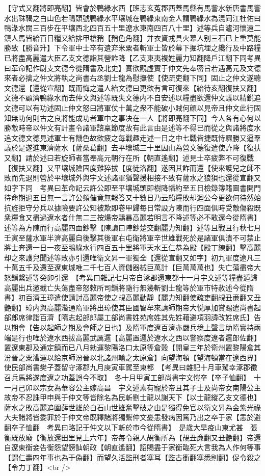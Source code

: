 【守式又翻將即亮翻】皆會於鴨綠水西【班志玄菟郡西蓋馬縣有馬訾水新唐書馬訾水出靺鞨之白山色若鴨頭號鴨綠水平壤城在鴨綠東南金人謂鴨綠水為混同江杜佑曰鴨淥水闊三百步在平壤西北四百五十里遼水東南四百八十里】述等兵自瀘河懷遠二鎮人馬皆給百日糧又給排甲槍矟【矟色角翻】并衣資戎具火幕人别三石已上重莫能勝致【勝音升】下令軍中士卒有遺弃米粟者斬軍士皆於幕下掘坑埋之纔行及中路糧已將盡高麗遣大臣乙支文德詣其營詐降【乙支東夷複姓麗力知翻降戶江翻下同考異曰革命記作尉支文德今從隋書及北史】實欲觀虛實于仲文先奉密旨若遇高元及文德來者必擒之仲文將執之尚書右丞劉士龍為慰撫使【使疏吏翻下同】固止之仲文遂聽文德還【還從宣翻】既而悔之遣人紿文德曰更欲有言可復來【紿待亥翻復扶又翻】文德不顧濟鴨綠水而去仲文與述等既失文德内不自安述以糧盡欲還仲文議以精鋭追文德可以有功述固止仲文怒曰將軍仗十萬之衆不能破小賊何顔以見帝且仲文此行固知無功何則古之良將能成功者軍中之事决在一人【將即亮翻下同】今人各有心何以勝敵時帝以仲文有計畫令諸軍諮稟節度故有此言由是述等不得已而從之與諸將度水追文德文德見述軍士有饑色故欲疲之每戰趣走述一日之中七戰皆捷既恃驟勝又逼羣議於是遂進東濟薩水【薩桑葛翻】去平壤城三十里因山為營文德復遣使詐降【復扶又翻】請於述曰若旋師者當奉高元朝行在所【朝直遙翻】述見士卒疲弊不可復戰【復扶又翻】又平壤城險固度難猝拔【度徒洛翻】遂因其詐而還【使來護兒之師不敗而先退則營於平壤城外與宇文述諸軍猶聲援相接不致有薩水之狼狽也還從宣翻又如字下同　考異曰革命記云許公即至平壤城頭即樹降幡約至五日檢錄簿籍圖書開門待命期過五日無一言許公頻催竟無報答又十數日乃云船糧敗却迴公今更欲何待然始抗旌拒守分兵以據險要許公知被欺即卷甲歸每日常設方陳而行四面俱時受敵傷殺既衆糧食又盡過遼水者什無二三按煬帝驕暴高麗若明言不降述等必不敢還今從隋書】述等為方陳而行高麗四面鈔擊【陳讀曰陣鈔楚交翻麗力知翻】述等且戰且行秋七月壬寅至薩水軍半濟高麗自後擊其後軍右屯衛將軍辛世雄戰死於是諸軍俱潰不可禁止將士奔還一日一夜至鴨綠水行四百五十里將軍天水王仁恭為殿【殿丁練翻】擊高麗却之來護兒聞述等敗亦引還唯衛文昇一軍獨全【還從宣翻又如字】初九軍度遼凡三十萬五千及還至遼東城唯二千七百人資儲器械巨萬計【巨萬萬萬也】失亡蕩盡帝大怒鎻繫述等癸卯引還　【考異曰雜記七月帝自涿郡還東都十一月宇文述等糧盡遁歸高麗出兵邀截亡失蕩盡帝怒敕所司鎻將隨行無幾斬劉士龍等於軍市特赦述今從隋書】初百濟王璋遣使請討高麗帝使之覘高麗動靜【麗力知翻使疏吏翻覘丑亷翻又丑艶翻】璋内與高麗濳通隋軍將出璋使其臣國智牟來請師期帝大悦厚加賞賜遣尚書起部郎席律詣百濟【隋志起部郎屬工部尚書姓苑席姓其先姓藉避項羽諱改姓席氏】告以期會【告以起師之期及會師之日也】及隋軍度遼百濟亦嚴兵境上聲言助隋實持兩端是行也唯於遼水西拔高麗武厲邏【高麗置邏於遼水之西以警察度遼者邏郎佐翻】置遼東郡及通定鎮而已八月勑運黎陽洛口太原等倉穀【開皇三年於衛州置黎陽倉其汾晉之粟漕運以給京師汾晉以北諸州輸之太原倉】向望海頓【望海頓當在遼西界】使民部尚書樊子蓋留守涿郡九月庚寅車駕至東都　【考異曰雜記十月車駕幸涿郡徵召兵馬將遂度遼之功蓋誤今不取】　冬十月甲寅工部尚書宇文愷卒【卒子恤翻】　十一月己卯以宗女為華容公主嫁高昌　宇文述素有寵於帝且其子士及尚帝女南陽公主故帝不忍誅甲申與于仲文等皆除名為民斬劉士龍以謝天下【以士龍縱乙支文德也】薩水之敗高麗追圍薛世雄於白石山世雄奮擊破之由是獨得免官以衛文昇為金紫光祿大夫諸將皆委罪於于仲文帝既釋諸將獨繫仲文憂恚發病因篤乃出之卒于家【恚於避翻卒子恤翻　考異曰略記于仲文以下斬於市今從隋書】　是歲大旱疫山東尤甚　張衡既放廢【衡放還田里見上六年】帝每令親人覘衡所為【覘丑亷翻又丑艶翻】帝還自遼東衡妾告衡怨望謗訕朝政【朝直遙翻】詔賜盡于家衡臨死大言我為人作何等事【謂仁壽四年事也為于偽翻】而望久活監刑者塞耳【監古銜翻塞悉則翻】促令殺之【令力丁翻】<br />
